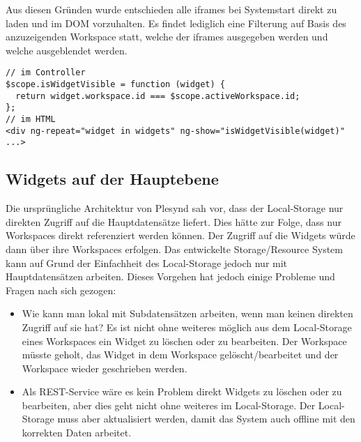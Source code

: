 Aus diesen Gründen wurde entschieden alle iframes bei Systemstart direkt zu laden und im \ac{DOM} vorzuhalten. Es findet lediglich eine Filterung auf Basis des anzuzeigenden Workspace statt, welche der iframes ausgegeben werden und welche ausgeblendet werden.
\begin{lstlisting}
// im Controller
$scope.isWidgetVisible = function (widget) {
  return widget.workspace.id === $scope.activeWorkspace.id;
};
// im HTML
<div ng-repeat="widget in widgets" ng-show="isWidgetVisible(widget)" ...>
\end{lstlisting}

\subsection{Widgets auf der Hauptebene}
Die ursprüngliche Architektur von Plesynd sah vor, dass der Local-Storage nur direkten Zugriff auf die Hauptdatensätze liefert. Dies hätte zur Folge, dass nur Workspaces direkt referenziert werden können. Der Zugriff auf die Widgets würde dann über ihre Workspaces erfolgen. Das entwickelte Storage/Resource System kann auf Grund der Einfachheit des Local-Storage jedoch nur mit Hauptdatensätzen arbeiten. Dieses Vorgehen hat jedoch einige Probleme und Fragen nach sich gezogen: 
\begin{itemize}
 \item Wie kann man lokal mit Subdatensätzen arbeiten, wenn man keinen direkten Zugriff auf sie hat? Es ist nicht ohne weiteres möglich aus dem Local-Storage eines Workspaces ein Widget zu löschen oder zu bearbeiten. Der Workspace müsste geholt, das Widget in dem Workspace gelöscht/bearbeitet und der Workspace wieder geschrieben werden. 
 \item Als REST-Service wäre es kein Problem direkt Widgets zu löschen oder zu bearbeiten, aber dies geht nicht ohne weiteres im Local-Storage. Der Local-Storage muss aber aktualisiert werden, damit das System auch offline mit den korrekten Daten arbeitet.
\end{itemize} 

